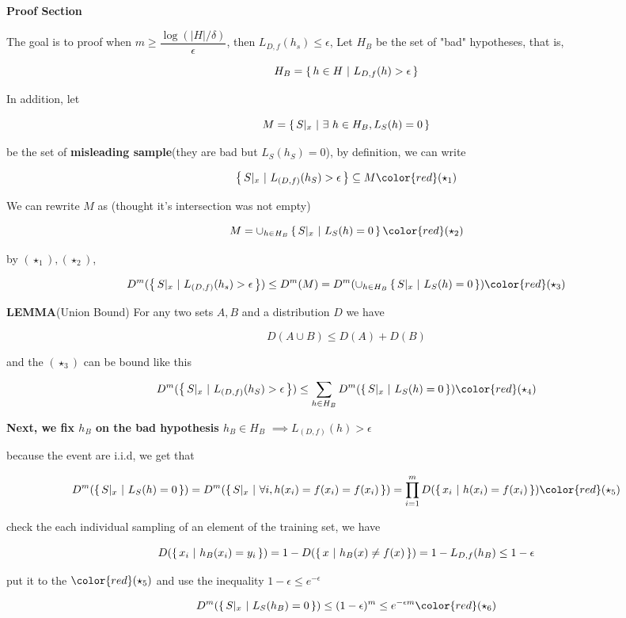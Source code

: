 \textbf{Proof Section}

The goal is to proof when $m \geq \dfrac{\log(|H|/\delta)}{\epsilon}$, then $L_{D,f}(h_s) \leq \epsilon$, Let $H_B$ be the set of "bad" hypotheses, that is,

$$H_B = \left\{ \,h \in H~|~L_{D,f}(h)>\epsilon \,\right\}$$

In addition, let

$$M = \left\{ \,S|_x ~|~ \exists~h \in H_B,L_S(h) = 0 \,\right\}$$

be the set of \textbf{misleading sample}(they are bad but $L_S(h_S) = 0$), by definition, we can write 

$$\sett{S|_x ~|~ L_{(D,f)}(h_S) > \epsilon} \subseteq M\color{red}(\star_1) $$


We can rewrite $M$ as (thought it's intersection was not empty)

$$M = \cup_{h \in H_B}\sett{S|_x ~|~ L_S(h) = 0}\color{red}(\star_2)$$

by $(\star_1),(\star_2)$,

$$D^m(\sett{S|_x~|~L_{(D,f)}(h_s)>\epsilon}) \leq D^m(M) = D^m(\cup_{h\in H_B}\sett{S|_x ~|~ L_S(h) = 0})\color{red}(\star_3)$$


\textbf{LEMMA}(Union Bound) For any two sets $A,B$ and a distribution $D$ we have

$$D(A\cup B) \leq D(A) + D(B)$$

and the $(\star_3)$ can be bound like this

$$D^m(\sett{S|_x ~|~ L_{(D,f)}(h_S)>\epsilon}) \leq \sum_{h \in H_B}D^m(\sett{S|_x ~|~ L_S(h) = 0})\color{red}(\star_4)$$

\textbf{Next, we fix $h_B$ on the bad hypothesis $h_B \in H_B$} $\implies L_{(D,f)}(h) > \epsilon$

because the event are i.i.d, we get that

$$D^m(\sett{S|_x~|~L_S(h)=0}) = D^m(\sett{S|_x ~|~\forall i,h(x_i) = f(x_i) = f(x_i)}) = \prod^m_{i=1}D(\sett{x_i~|~h(x_i) = f(x_i)})\color{red}(\star_5)$$



check the each individual sampling of an element of the training set, we have

$$D(\left\{ \,x_i~|~h_B(x_i) = y_i \,\right\}) = 1-D(\left\{ \,x ~|~ h_B(x) \neq f(x) \,\right\})=1 - L_{D,f}(h_B) \leq 1 - \epsilon$$

put it to the $\color{red}(\star_5)$ and use the inequality $1 - \epsilon \leq e^{-\epsilon}$

$$D^m(\sett{S|_x~|~ L_S(h_B) = 0}) \leq (1 -\epsilon)^m \leq e^{-\epsilon m}\color{red}(\star_6)$$

